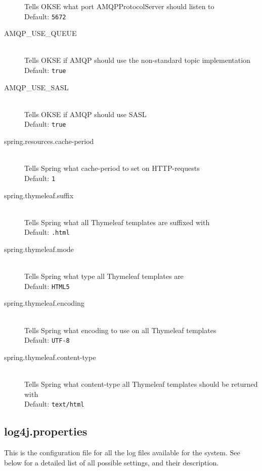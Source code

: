 \begin{description}
  Tells OKSE what port AMQPProtocolServer should listen to \hfill \\ Default: \verb!5672!
  \item[AMQP\_USE\_QUEUE] \hfill \\
  Tells OKSE if AMQP should use the non-standard topic implementation \hfill \\ Default: \verb!true!
  \item[AMQP\_USE\_SASL] \hfill \\
  Tells OKSE if AMQP should use SASL \hfill \\ Default: \verb!true!
  \item[spring.resources.cache-period] \hfill \\
  Tells Spring what cache-period to set on HTTP-requests \hfill \\ Default: \verb!1!
  \item[spring.thymeleaf.suffix] \hfill \\
  Tells Spring what all Thymeleaf templates are suffixed with \hfill \\ Default: \verb!.html! 
   \item[spring.thymeleaf.mode] \hfill \\
  Tells Spring what type all Thymeleaf templates are \hfill \\ Default: \verb!HTML5!
   \item[spring.thymeleaf.encoding] \hfill \\
  Tells Spring what encoding to use on all Thymeleaf templates \hfill \\ Default: \verb!UTF-8!
   \item[spring.thymeleaf.content-type] \hfill \\
  Tells Spring what content-type all Thymeleaf templates should be returned with \hfill \\ Default: \verb!text/html! 
\end{description}
  
 \subsection{log4j.properties}
 \label{subsec:log4j.properties}
 
This is the configuration file for all the log files available for the system. See below for a detailed list of all possible settings, and their description.


